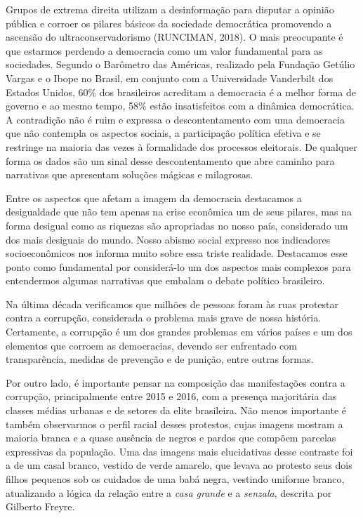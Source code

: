 Grupos de extrema direita utilizam a desinformação para disputar a
opinião pública e corroer os pilares básicos da sociedade democrática
promovendo a ascensão do ultraconservadorismo (RUNCIMAN, 2018). O mais
preocupante é que estarmos perdendo a democracia como um valor
fundamental para as sociedades. Segundo o Barômetro das Américas,
realizado pela Fundação Getúlio Vargas e o Ibope no Brasil, em conjunto
com a Universidade Vanderbilt dos Estados Unidos, 60\% dos brasileiros
acreditam a democracia é a melhor forma de governo e ao mesmo tempo,
58\% estão insatisfeitos com a dinâmica democrática. A contradição não é
ruim e expressa o descontentamento com uma democracia que não contempla
os aspectos sociais, a participação política efetiva e se restringe na
maioria das vezes à formalidade dos processos eleitorais. De qualquer
forma os dados são um sinal desse descontentamento que abre caminho para
narrativas que apresentam soluções mágicas e milagrosas.

Entre os aspectos que afetam a imagem da democracia destacamos a
desigualdade que não tem apenas na crise econômica um de seus pilares,
mas na forma desigual como as riquezas são apropriadas no nosso país,
considerado um dos mais desiguais do mundo. Nosso abismo social expresso
nos indicadores socioeconômicos nos informa muito sobre essa triste
realidade. Destacamos esse ponto como fundamental por considerá-lo um
dos aspectos mais complexos para entendermos algumas narrativas que
embalam o debate político brasileiro.

Na última década verificamos que milhões de pessoas foram às ruas
protestar contra a corrupção, considerada o problema mais grave de nossa
história. Certamente, a corrupção é um dos grandes problemas em vários
países e um dos elementos que corroem as democracias, devendo ser
enfrentado com transparência, medidas de prevenção e de punição, entre
outras formas.

Por outro lado, é importante pensar na composição das manifestações
contra a corrupção, principalmente entre 2015 e 2016, com a presença
majoritária das classes médias urbanas e de setores da elite brasileira.
Não menos importante é também observarmos o perfil racial desses
protestos, cujas imagens mostram a maioria branca e a quase ausência de
negros e pardos que compõem parcelas expressivas da população. Uma das
imagens mais elucidativas desse contraste foi a de um casal branco,
vestido de verde amarelo, que levava ao protesto seus dois filhos
pequenos sob os cuidados de uma babá negra, vestindo uniforme branco,
atualizando a lógica da relação entre a \textit{casa grande} e a \textit{senzala},
descrita por Gilberto Freyre.

